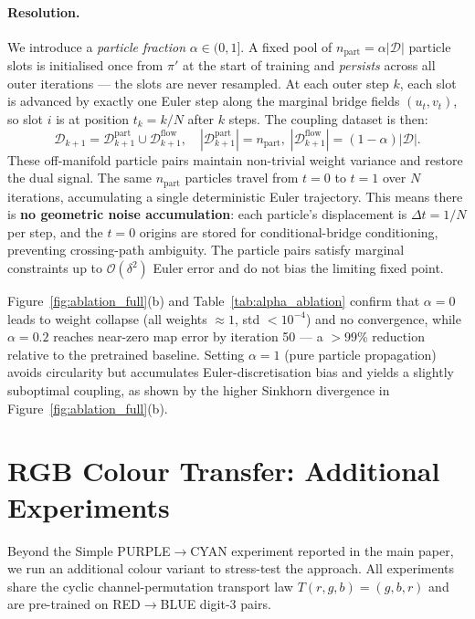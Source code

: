 \documentclass[11pt]{article}
\theoremstyle{definition}
\numberwithin{equation}{section}%
\begin{document}
\paragraph{Resolution.}
We introduce a \emph{particle fraction} $\alpha\in(0,1]$.
A fixed pool of $n_\mathrm{part}\!=\!\alpha|\mathcal{D}|$ particle slots is
initialised once from $\pi'$ at the start of training and \emph{persists}
across all outer iterations — the slots are never resampled.
At each outer step $k$, each slot is advanced by exactly one Euler step
along the marginal bridge fields $(u_t,v_t)$, so slot $i$ is at position
$t_k = k/N$ after $k$ steps.
The coupling dataset is then:
\[
\mathcal{D}_{k+1}
= \mathcal{D}_{k+1}^{\mathrm{part}}
\cup \mathcal{D}_{k+1}^{\mathrm{flow}},
\quad
|\mathcal{D}_{k+1}^{\mathrm{part}}| = n_\mathrm{part},\;
|\mathcal{D}_{k+1}^{\mathrm{flow}}| = (1-\alpha)|\mathcal{D}|.
\]
These off-manifold particle pairs maintain non-trivial weight variance and
restore the dual signal.
The same $n_\mathrm{part}$ particles travel from $t=0$ to $t=1$ over $N$
iterations, accumulating a single deterministic Euler trajectory.
This means there is \textbf{no geometric noise accumulation}: each particle's displacement is $\Delta t = 1/N$ per step, and the $t=0$ origins are stored for conditional-bridge conditioning, preventing crossing-path ambiguity.
The particle pairs satisfy marginal constraints up to $\mathcal{O}(\delta^2)$ Euler error and do not bias the limiting fixed point.

Figure~\ref{fig:ablation_full}(b) and Table~\ref{tab:alpha_ablation}
confirm that $\alpha\!=\!0$ leads to weight collapse (all weights $\approx 1$,
std $< 10^{-4}$) and no convergence, while $\alpha\!=\!0.2$ reaches
near-zero map error by iteration 50 — a $>99\%$ reduction relative to the
pretrained baseline.
Setting $\alpha\!=\!1$ (pure particle propagation) avoids circularity but
accumulates Euler-discretisation bias and yields a slightly suboptimal
coupling, as shown by the higher Sinkhorn divergence in
Figure~\ref{fig:ablation_full}(b).

% 
\section{RGB Colour Transfer: Additional Experiments}
\label{app:color-extra}
% 

Beyond the Simple PURPLE$\to$CYAN experiment reported in the main paper,
we run an additional colour variant to stress-test the approach.
All experiments share the cyclic channel-permutation transport law
$T(r,g,b) = (g,b,r)$ and are pre-trained on RED$\to$BLUE digit-3 pairs.
\end{document}
